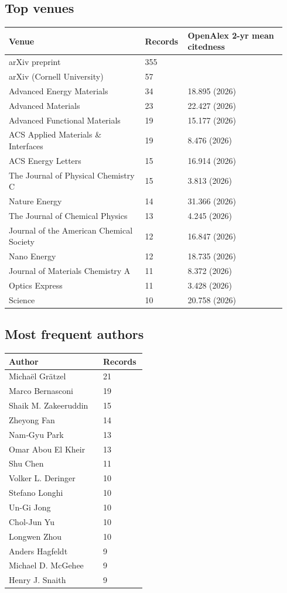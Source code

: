 \documentclass[10pt,a4paper]{article}
\begin{document}
\subsection*{Top venues}
{\scriptsize\begin{longtable}{p{0.477\linewidth}p{0.119\linewidth}p{0.347\linewidth}}
\hline
\textbf{Venue} & \textbf{Records} & \textbf{OpenAlex 2-yr mean citedness} \\ \hline
\endhead
arXiv preprint & 355 &  \\
arXiv (Cornell University) & 57 &  \\
Advanced Energy Materials & 34 & 18.895 (2026) \\
Advanced Materials & 23 & 22.427 (2026) \\
Advanced Functional Materials & 19 & 15.177 (2026) \\
ACS Applied Materials \& Interfaces & 19 & 8.476 (2026) \\
ACS Energy Letters & 15 & 16.914 (2026) \\
The Journal of Physical Chemistry C & 15 & 3.813 (2026) \\
Nature Energy & 14 & 31.366 (2026) \\
The Journal of Chemical Physics & 13 & 4.245 (2026) \\
Journal of the American Chemical Society & 12 & 16.847 (2026) \\
Nano Energy & 12 & 18.735 (2026) \\
Journal of Materials Chemistry A & 11 & 8.372 (2026) \\
Optics Express & 11 & 3.428 (2026) \\
Science & 10 & 20.758 (2026) \\
\hline
\end{longtable}}
\subsection*{Most frequent authors}
{\scriptsize\begin{longtable}{p{0.655\linewidth}p{0.300\linewidth}}
\hline
\textbf{Author} & \textbf{Records} \\ \hline
\endhead
Michaël Grätzel & 21 \\
Marco Bernasconi & 19 \\
Shaik M. Zakeeruddin & 15 \\
Zheyong Fan & 14 \\
Nam‐Gyu Park & 13 \\
Omar Abou El Kheir & 13 \\
Shu Chen & 11 \\
Volker L. Deringer & 10 \\
Stefano Longhi & 10 \\
Un-Gi Jong & 10 \\
Chol-Jun Yu & 10 \\
Longwen Zhou & 10 \\
Anders Hagfeldt & 9 \\
Michael D. McGehee & 9 \\
Henry J. Snaith & 9 \\
\hline
\end{longtable}}
\end{document}
